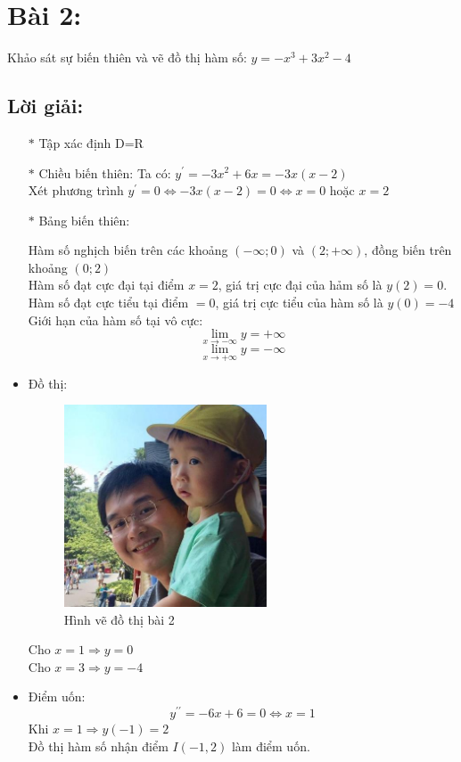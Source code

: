 \section*{Bài 2:}
Khảo sát sự biến thiên và vẽ đồ thị hàm số: $y = -x^3 + 3x^2 - 4$

\subsection*{Lời giải:}
\begin{itemize}
\item[$\ast$] Tập xác định D=R
\item[$\ast$] Chiều biến thiên:
Ta có: $y^{\prime} = -3x^2 + 6x = -3x(x-2)$ \\
Xét phương trình $y^{\prime} = 0 \Leftrightarrow -3x(x-2) = 0 \Leftrightarrow x = 0$ hoặc $x = 2$
\item[$\ast$] Bảng biến thiên:
	\begin{figure}[H]
		\centering
	\end{figure}
	Hàm số nghịch biến trên các khoảng $(-\infty; 0)$ và $(2; +\infty)$, đồng biến trên khoảng $(0; 2)$ \\
	Hàm số đạt cực đại tại điểm $x=2$, giá trị cực đại của hảm số là $y(2)=0$. \\
	Hàm số đạt cực tiểu tại điểm $=0$, giá trị cực tiểu của hàm số là $y(0)=-4$ \\
	Giới hạn của hàm số tại vô cực: 
	$$\lim_{x \to -\infty}{y} = +\infty$$
	$$\lim_{x \to +\infty}{y} = -\infty$$
\item Đồ thị:
	\begin{figure}[H]
		\centering
		\includegraphics[width=6cm]{images/cover/dhsp_logo.png}
		\caption{Hình vẽ đồ thị bài 2}
	\end{figure}
	Cho $x = 1 \Rightarrow y = 0$ \\
	Cho $x = 3 \Rightarrow y = -4$
\item Điểm uốn:
	$$y^{\prime\prime} = -6x + 6 = 0 \Leftrightarrow x = 1$$
	Khi $x = 1 \Rightarrow y(-1) = 2$ \\
	Đồ thị hàm số nhận điểm $I(-1, 2)$ làm điểm uốn. 
\end{itemize}

